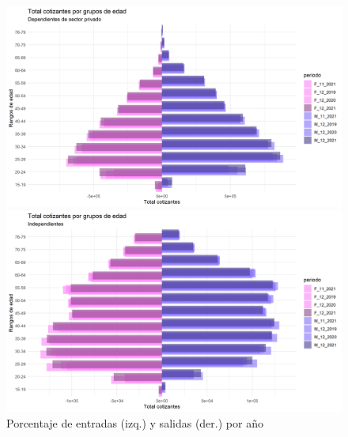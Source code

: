 \begin{figure}[!htbp]
\centering
\begin{minipage}{0.5\textwidth}
  \centering
  \includegraphics[width=\linewidth]{figures/02_longitudinal/salidas_piramide_dependientes.png}
\end{minipage}%
\begin{minipage}{0.5\textwidth}
  \centering
  \includegraphics[width=\linewidth]{figures/02_longitudinal/salidas_piramide_independientes.png}
\end{minipage}
\caption{Porcentaje de entradas (izq.) y salidas (der.) por año}
\label{figura:piramides}
\end{figure}


